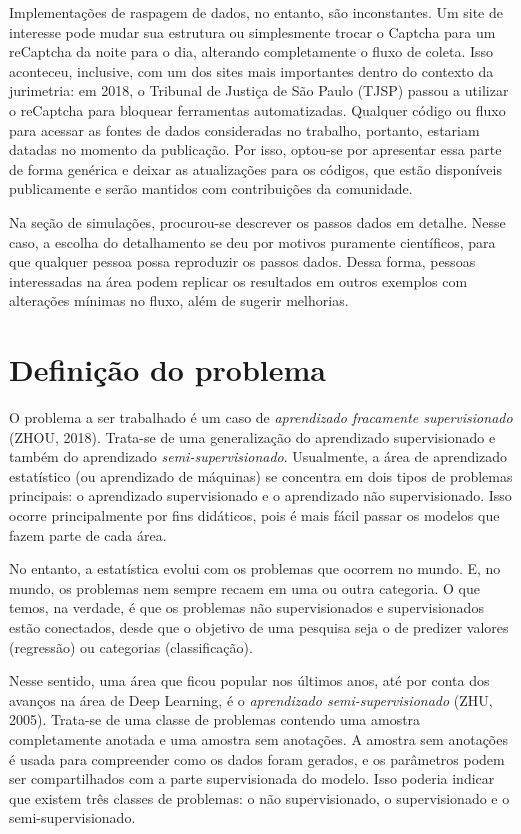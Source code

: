 \documentclass[12pt,twoside,brazilian]{book}
\begin{document}
Implementações de raspagem de dados, no entanto, são inconstantes. Um
site de interesse pode mudar sua estrutura ou simplesmente trocar o
Captcha para um reCaptcha da noite para o dia, alterando completamente o
fluxo de coleta. Isso aconteceu, inclusive, com um dos sites mais
importantes dentro do contexto da jurimetria: em 2018, o Tribunal de
Justiça de São Paulo (TJSP) passou a utilizar o reCaptcha para bloquear
ferramentas automatizadas. Qualquer código ou fluxo para acessar as
fontes de dados consideradas no trabalho, portanto, estariam datadas no
momento da publicação. Por isso, optou-se por apresentar essa parte de
forma genérica e deixar as atualizações para os códigos, que estão
disponíveis publicamente e serão mantidos com contribuições da
comunidade.

Na seção de simulações, procurou-se descrever os passos dados em
detalhe. Nesse caso, a escolha do detalhamento se deu por motivos
puramente científicos, para que qualquer pessoa possa reproduzir os
passos dados. Dessa forma, pessoas interessadas na área podem replicar
os resultados em outros exemplos com alterações mínimas no fluxo, além
de sugerir melhorias.

\hypertarget{definiuxe7uxe3o-do-problema}{%
\section{Definição do problema}\label{definiuxe7uxe3o-do-problema}}

O problema a ser trabalhado é um caso de \emph{aprendizado fracamente
supervisionado} (ZHOU, 2018). Trata-se de uma generalização do
aprendizado supervisionado e também do aprendizado
\emph{semi-supervisionado}. Usualmente, a área de aprendizado
estatístico (ou aprendizado de máquinas) se concentra em dois tipos de
problemas principais: o aprendizado supervisionado e o aprendizado não
supervisionado. Isso ocorre principalmente por fins didáticos, pois é
mais fácil passar os modelos que fazem parte de cada área.

No entanto, a estatística evolui com os problemas que ocorrem no mundo.
E, no mundo, os problemas nem sempre recaem em uma ou outra categoria. O
que temos, na verdade, é que os problemas não supervisionados e
supervisionados estão conectados, desde que o objetivo de uma pesquisa
seja o de predizer valores (regressão) ou categorias (classificação).

Nesse sentido, uma área que ficou popular nos últimos anos, até por
conta dos avanços na área de Deep Learning, é o \emph{aprendizado
semi-supervisionado} (ZHU, 2005). Trata-se de uma classe de problemas
contendo uma amostra completamente anotada e uma amostra sem anotações.
A amostra sem anotações é usada para compreender como os dados foram
gerados, e os parâmetros podem ser compartilhados com a parte
supervisionada do modelo. Isso poderia indicar que existem três classes
de problemas: o não supervisionado, o supervisionado e o
semi-supervisionado.
\end{document}
